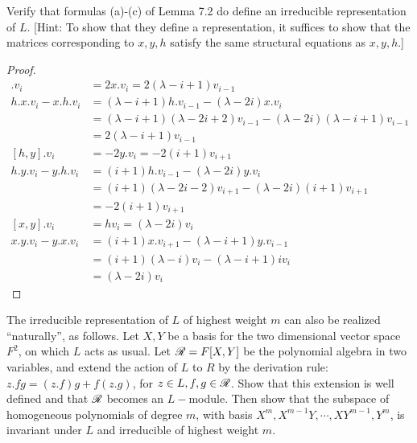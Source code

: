\begin{ex}\label{7.3}
  Verify that formulas (a)-(c) of Lemma 7.2 do define an irreducible representation of $L$. [Hint: To show that they define a representation, it suffices to show that the matrices corresponding to $x, y, h$ satisfy the same structural equations as $x, y, h$.]
\end{ex}
\begin{proof}
  \begin{align*}
    [h, x].v_i &= 2x.v_i = 2(\lambda - i + 1)v_{i-1} \\
    h.x.v_i - x.h.v_i &= (\lambda - i + 1)h.v_{i-1} - (\lambda - 2i)x.v_i \\
                           &= (\lambda - i + 1)(\lambda - 2i + 2)v_{i-1} - (\lambda - 2i)(\lambda - i + 1)v_{i-1} \\
                           &= 2(\lambda - i + 1)v_{i-1} \\
    [h, y].v_i &= -2y.v_i = -2(i + 1)v_{i+1} \\
    h.y.v_i - y.h.v_i &= (i + 1)h.v_{i-1} - (\lambda - 2i)y.v_i \\
                           &= (i + 1)(\lambda - 2i - 2)v_{i+1} - (\lambda - 2i)(i + 1)v_{i+1} \\
                           &= -2(i + 1)v_{i+1} \\
    [x, y].v_i &= hv_i = (\lambda - 2i)v_i \\
    x.y.v_i - y.x.v_i &= (i + 1)x.v_{i+1} - (\lambda - i + 1)y.v_{i-1} \\
                           &= (i + 1)(\lambda - i)v_i - (\lambda - i + 1)iv_i \\
                           &= (\lambda - 2i)v_i
  \end{align*}
\end{proof}

\begin{ex}\label{7.4}
  The irreducible representation of $L$ of highest weight $m$ can also be realized ``naturally'', as follows. Let $X, Y$ be a basis for the two dimensional vector space $F^2$, on which $L$ acts as usual. Let $\mathscr{R} = F[X, Y]$ be the polynomial algebra in two variables, and extend the action of $L$ to $R$ by the derivation rule: $z.fg = (z.f )g + f(z.g)$, for $z \in L, f, g \in \mathscr{R}$. Show that this extension is well defined and that $\mathscr{R}$ becomes an $L-$module. Then show that the subspace of homogeneous polynomials of degree $m$, with basis $X^m,X^{m-1}Y,\cdots ,XY^{m-1},Y^m$, is invariant under $L$ and irreducible of highest weight $m$.
\end{ex}

